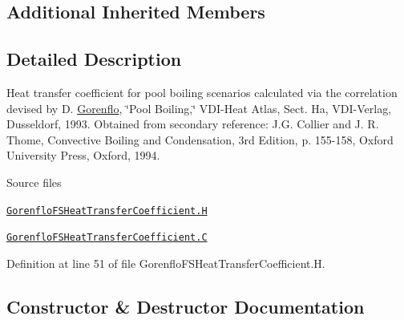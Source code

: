\subsection*{Additional Inherited Members}


\subsection{Detailed Description}
Heat transfer coefficient for pool boiling scenarios calculated via the correlation devised by D. \hyperlink{classFoam_1_1FSHeatTransferCoefficientModels_1_1Gorenflo}{Gorenflo}, \char`\"{}\+Pool Boiling,\char`\"{} V\+D\+I-\/\+Heat Atlas, Sect. Ha, V\+D\+I-\/\+Verlag, Dusseldorf, 1993. Obtained from secondary reference\+: J.\+G. Collier and J. R. Thome, Convective Boiling and Condensation, 3rd Edition, p. 155-\/158, Oxford University Press, Oxford, 1994. 

\label{_Description}%
 \begin{DoxyParagraph}{Source files}

\begin{DoxyItemize}
\item \href{../../../home/carlo/data/GeN-Foam/GeN-Foam_ffn/GeN-Foam/GeN-Foam/classes/thermalHydraulics/src/physicsModels/heatTransferModels/FSHeatTransferCoefficientModels/Gorenflo/GorenfloFSHeatTransferCoefficient.H}{\tt Gorenflo\+F\+S\+Heat\+Transfer\+Coefficient.\+H} 
\item \href{../../../home/carlo/data/GeN-Foam/GeN-Foam_ffn/GeN-Foam/GeN-Foam/classes/thermalHydraulics/src/physicsModels/heatTransferModels/FSHeatTransferCoefficientModels/Gorenflo/GorenfloFSHeatTransferCoefficient.C}{\tt Gorenflo\+F\+S\+Heat\+Transfer\+Coefficient.\+C} 
\end{DoxyItemize}
\end{DoxyParagraph}


Definition at line 51 of file Gorenflo\+F\+S\+Heat\+Transfer\+Coefficient.\+H.



\subsection{Constructor \& Destructor Documentation}
\mbox{\label{classFoam_1_1FSHeatTransferCoefficientModels_1_1Gorenflo_a37879213926c3fedbe8982385fd5cf2a}} 

